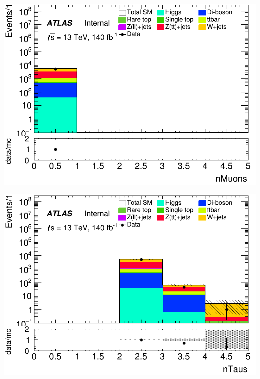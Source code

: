 \documentclass[usenames,dvipsnames]{beamer}
\begin{document}
\begin{frame}
    \begin{minipage}{0.32\textwidth}
        \centering
        \includegraphics[width=\textwidth]{graphics/H_met/H_met_nMuons.png}
    \end{minipage}
    \hfill
    \begin{minipage}{0.32\textwidth}
        \centering
        \includegraphics[width=\textwidth]{graphics/H_met/H_met_nTaus.png}
    \end{minipage}
    \hfill
    \begin{minipage}{0.32\textwidth}
        \centering

\end{minipage}
\end{frame}
\end{document}
